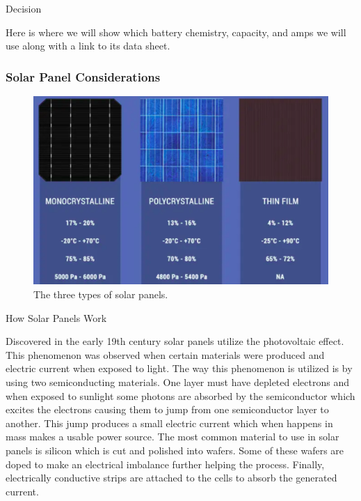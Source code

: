 Decision 

Here is where we will show which battery chemistry, capacity, and amps we will use along with a link to its data sheet. 

\subsubsection{Solar Panel Considerations}

\begin{figure}
    \centering
    \includegraphics[width=6in]{figures/solar panel overview.png}
    \caption{The three types of solar panels.}
    \label{label-name} %
    
\end{figure}

How Solar Panels Work 

Discovered in the early 19th century solar panels utilize the photovoltaic effect. This phenomenon was observed when certain materials were produced and electric current when exposed to light. The way this phenomenon is utilized is by using two semiconducting materials. One layer must have depleted electrons and when exposed to sunlight some photons are absorbed by the semiconductor which excites the electrons causing them to jump from one semiconductor layer to another. This jump produces a small electric current which when happens in mass makes a usable power source. The most common material to use in solar panels is silicon which is cut and polished into wafers. Some of these wafers are doped to make an electrical imbalance further helping the process. Finally, electrically conductive strips are attached to the cells to absorb the generated current. 

